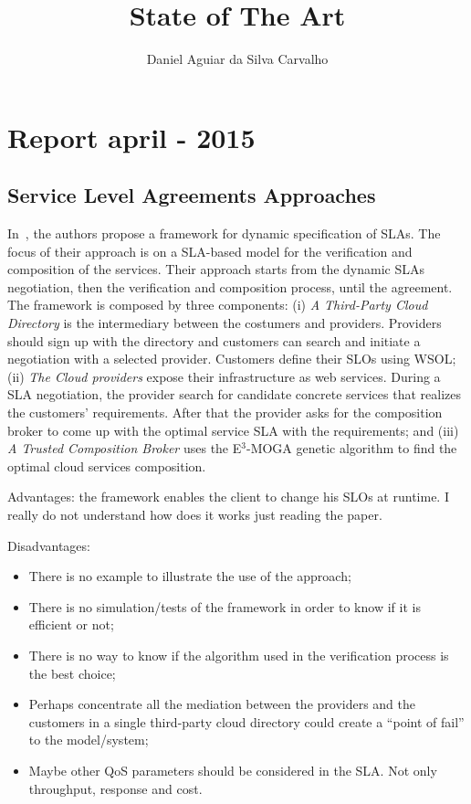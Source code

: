 \documentclass[12pt,a4paper,oneside]{book}
\author{Daniel Aguiar da Silva Carvalho}
\title{State of The Art}
\begin{document}
\titleformat{\chapter}[hang]{\bf\huge}{\thechapter}{2pc}{}
\maketitle
\chapter{Report april - 2015}

\section{Service Level Agreements Approaches}

In~\cite{001}, the authors propose a framework for dynamic specification of SLAs. The focus of their approach is on a SLA-based model for the verification and composition of the services. Their approach starts from the dynamic SLAs negotiation, then the verification and composition process, until the agreement. The framework is composed by three components: (i) \textit{A Third-Party Cloud Directory} is the intermediary between the costumers and providers. Providers should sign up with the directory and customers can search and initiate a negotiation with a selected provider. Customers define their SLOs using WSOL; (ii) \textit{The Cloud providers} expose their infrastructure as web services. During a SLA negotiation, the provider search for candidate concrete services that realizes the customers' requirements. After that the provider asks for the composition broker to come up with the optimal service SLA with the requirements; and (iii) \textit{A Trusted Composition Broker} uses the E$^{3}$-MOGA genetic algorithm to find the optimal cloud services composition.

\begin{description}
\item Advantages: the framework enables the client to change his SLOs at runtime. I really do not understand how does it works just reading the paper.
\item Disadvantages: 
\begin{itemize}
\item There is no example to illustrate the use of the approach;
\item There is no simulation/tests of the framework in order to know if it is efficient or not;
\item There is no way to know if the algorithm used in the verification process is the best choice;
\item Perhaps concentrate all the mediation between the providers and the customers in a single third-party cloud directory could create a ``point of fail'' to the model/system;
\item Maybe other QoS parameters should be considered in the SLA. Not only throughput, response and cost.
\end{itemize}
\end{description}
\end{document}

